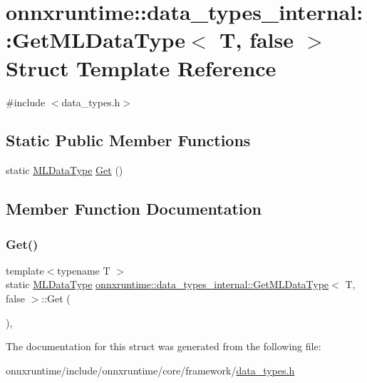 \hypertarget{structonnxruntime_1_1data__types__internal_1_1GetMLDataType_3_01T_00_01false_01_4}{}\section{onnxruntime\+:\+:data\+\_\+types\+\_\+internal\+:\+:Get\+M\+L\+Data\+Type$<$ T, false $>$ Struct Template Reference}
\label{structonnxruntime_1_1data__types__internal_1_1GetMLDataType_3_01T_00_01false_01_4}


{\ttfamily \#include $<$data\+\_\+types.\+h$>$}

\subsection*{Static Public Member Functions}
\begin{DoxyCompactItemize}
\item 
static \mbox{\hyperlink{namespaceonnxruntime_ad77d0a6e838ec7da5dc35fed5ee66b49}{M\+L\+Data\+Type}} \mbox{\hyperlink{structonnxruntime_1_1data__types__internal_1_1GetMLDataType_3_01T_00_01false_01_4_a4f6339d488053ecc72d8305f58ebf5cc}{Get}} ()
\end{DoxyCompactItemize}


\subsection{Member Function Documentation}
\mbox{\label{structonnxruntime_1_1data__types__internal_1_1GetMLDataType_3_01T_00_01false_01_4_a4f6339d488053ecc72d8305f58ebf5cc}} 
\subsubsection{\texorpdfstring{Get()}{Get()}}
{\footnotesize\ttfamily template$<$typename T $>$ \\
static \mbox{\hyperlink{namespaceonnxruntime_ad77d0a6e838ec7da5dc35fed5ee66b49}{M\+L\+Data\+Type}} \mbox{\hyperlink{structonnxruntime_1_1data__types__internal_1_1GetMLDataType}{onnxruntime\+::data\+\_\+types\+\_\+internal\+::\+Get\+M\+L\+Data\+Type}}$<$ T, false $>$\+::Get (\begin{DoxyParamCaption}{ }\end{DoxyParamCaption})\hspace{0.3cm}{\ttfamily [inline]}, {\ttfamily [static]}}



The documentation for this struct was generated from the following file\+:\begin{DoxyCompactItemize}
\item 
onnxruntime/include/onnxruntime/core/framework/\mbox{\hyperlink{data__types_8h}{data\+\_\+types.\+h}}\end{DoxyCompactItemize}
